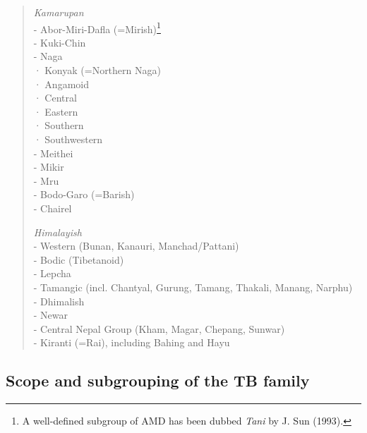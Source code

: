 \begin{itemize}
\begin{quote}
\textit{Kamarupan}\\
- Abor-Miri-Dafla (=Mirish)\footnote{A well-defined subgroup of AMD has been
dubbed \textit{Tani} by J. Sun (1993).}\\
- Kuki-Chin\\
- Naga\\
\hspace*{3ex}· Konyak (=Northern Naga)\\
\hspace*{3ex}· Angamoid\\
\hspace*{3ex}· Central\\
\hspace*{3ex}· Eastern\\
\hspace*{3ex}· Southern\\
\hspace*{3ex}· Southwestern\\
- Meithei\\
- Mikir\\
- Mru\\
- Bodo-Garo (=Barish)\\
- Chairel

\textit{Himalayish}\\
- Western (Bunan, Kanauri, Manchad/Pattani)\\
- Bodic (Tibetanoid)\\
- Lepcha\\
- Tamangic (incl. Chantyal, Gurung, Tamang, Thakali, Manang, Narphu)\\
- Dhimalish\\
- Newar\\
- Central Nepal Group (Kham, Magar, Chepang, Sunwar)\\
- Kiranti (=Rai), including Bahing and Hayu\\
\end{quote}

\subsection{Scope and subgrouping of the TB family}


\end{itemize}
